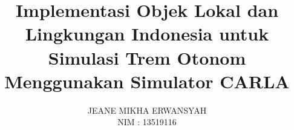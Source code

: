 \documentclass[bahasa, 12pt, a4paper, onecolumn, oneside, final]{report}
\begin{document}
\newcommand{\thedate}{\date{11 Juli 2023}}
\newcommand{\monthyear}{Juli 2023}

\newcommand{\capstonetitle}{Pengembangan Sistem Simulasi \textit{Autonomous Tram} dengan Simulator CARLA}
\newcommand{\thetitle}{Implementasi Objek Lokal dan Lingkungan Indonesia untuk
Simulasi Trem Otonom Menggunakan Simulator CARLA}
\newcommand{\thetitleinenglish}{Implementation of Indonesian Local Objects and
Enviromental Objects for Autonomous Tram Simulation Using CARLA Simulator}

\title{\thetitle}

\newcommand{\subtitle}{
    \bfseries \Large
    Laporan Tugas Akhir - Capstone

    \capstonetitle
}

\newcommand{\authorname}{Jeane Mikha Erwansyah}
\newcommand{\authornim}{13519116}
\author{
    \MakeUppercase{\authorname} \\
    NIM : \authornim
}


\newcommand{\advisoronename}{Achmad Imam Kistijantoro, S.T., M.Sc., Ph.D.}
\newcommand{\advisoronenip}{197308092006041001}
\newcommand{\advisortwoname}{Prof. Dr. Ir. Bambang Riyanto Trilaksono}
\newcommand{\advisortwonip}{196211151987031004}
\newcommand{\advisorapproval}{
    \centering
    \normalsize \normalfont

    \vspace{0.5cm}
    \begin{adjustwidth}{-45pt}{+65pt}
    \setlength{\tabcolsep}{12pt}
    \begin{tabular}{c@{\hskip 0.5cm}c}
        Pembimbing I,               & Pembimbing II,             \\
                                    &                            \\
                                    &                            \\
                                    &                            \\
                                    &                            \\
        \underline{\advisoronename} & \underline{\advisortwoname} \\
        NIP. \advisoronenip     & NIP. \advisortwonip     \\
    \end{tabular}
    \end{adjustwidth}
    }
\end{document}
